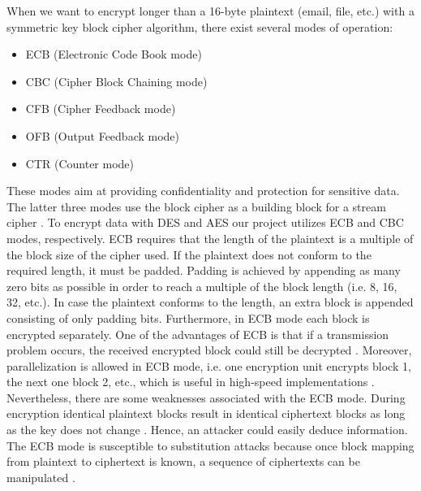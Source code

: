 When we want to encrypt longer than a 16-byte plaintext (email, file, etc.) with a symmetric key block cipher algorithm, there exist several modes of operation:
\begin{itemize}
\item ECB (Electronic Code Book mode)
\end{itemize}
\begin{itemize}
\item CBC (Cipher Block Chaining mode)
\end{itemize}
\begin{itemize}
\item CFB (Cipher Feedback mode) 
\end{itemize}
\begin{itemize}
\item OFB (Output Feedback mode)
\end{itemize}
\begin{itemize}
\item CTR (Counter mode)
\end{itemize}
These modes aim at providing confidentiality and protection for sensitive data. The latter three modes use the block cipher as a building block for a stream cipher \cite{springer2010}. To encrypt data with DES and AES our project utilizes ECB and CBC modes, respectively. ECB requires that the length of the plaintext is a multiple of the block size of the cipher used. If the plaintext does not conform to the required length, it must be padded. Padding is achieved by appending as many zero bits as possible in order to reach a multiple of the block length (i.e. 8, 16, 32, etc.). In case the plaintext conforms to the length, an extra block is appended consisting of only padding bits. Furthermore, in ECB mode each block is encrypted separately. One of the advantages of ECB is that if a transmission problem occurs, the received encrypted block could still be decrypted \cite{springer2010}. Moreover, parallelization is allowed in ECB mode, i.e. one encryption unit encrypts block 1, the next one block 2, etc., which is useful in high-speed implementations \cite{springer2010}. Nevertheless, there are some weaknesses associated with the ECB mode. During encryption identical plaintext blocks result in identical ciphertext blocks as long as the key does not change \cite{springer2010}. Hence, an attacker could easily deduce information. The ECB mode is susceptible to substitution attacks because once block mapping from plaintext to ciphertext is known, a sequence of ciphertexts can be manipulated \cite{springer2010}. 
